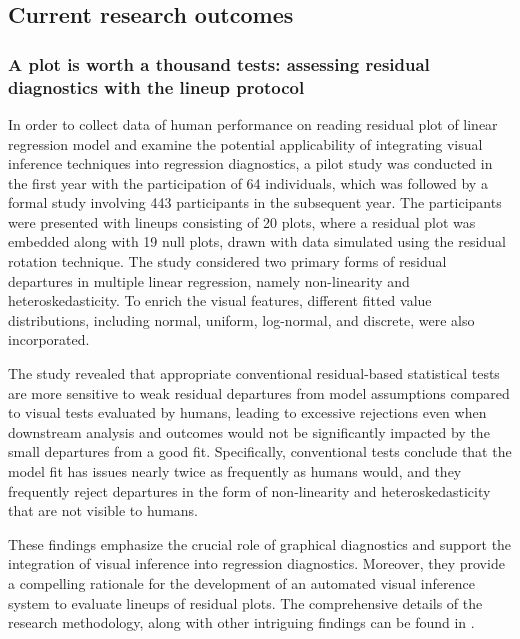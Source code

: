 \documentclass[11pt,a4paper,]{article}
\begin{document}
\hypertarget{current-research-outcomes}{%
\subsection{Current research outcomes}\label{current-research-outcomes}}

\hypertarget{a-plot-is-worth-a-thousand-tests-assessing-residual-diagnostics-with-the-lineup-protocol}{%
\subsubsection{A plot is worth a thousand tests: assessing residual diagnostics with the lineup protocol}\label{a-plot-is-worth-a-thousand-tests-assessing-residual-diagnostics-with-the-lineup-protocol}}

In order to collect data of human performance on reading residual plot of linear regression model and examine the potential applicability of integrating visual inference techniques into regression diagnostics, a pilot study was conducted in the first year with the participation of 64 individuals, which was followed by a formal study involving 443 participants in the subsequent year. The participants were presented with lineups consisting of 20 plots, where a residual plot was embedded along with 19 null plots, drawn with data simulated using the residual rotation technique. The study considered two primary forms of residual departures in multiple linear regression, namely non-linearity and heteroskedasticity. To enrich the visual features, different fitted value distributions, including normal, uniform, log-normal, and discrete, were also incorporated.

The study revealed that appropriate conventional residual-based statistical tests are more sensitive to weak residual departures from model assumptions compared to visual tests evaluated by humans, leading to excessive rejections even when downstream analysis and outcomes would not be significantly impacted by the small departures from a good fit. Specifically, conventional tests conclude that the model fit has issues nearly twice as frequently as humans would, and they frequently reject departures in the form of non-linearity and heteroskedasticity that are not visible to humans.

These findings emphasize the crucial role of graphical diagnostics and support the integration of visual inference into regression diagnostics. Moreover, they provide a compelling rationale for the development of an automated visual inference system to evaluate lineups of residual plots. The comprehensive details of the research methodology, along with other intriguing findings can be found in \textcite{li2023plot}.
\end{document}
